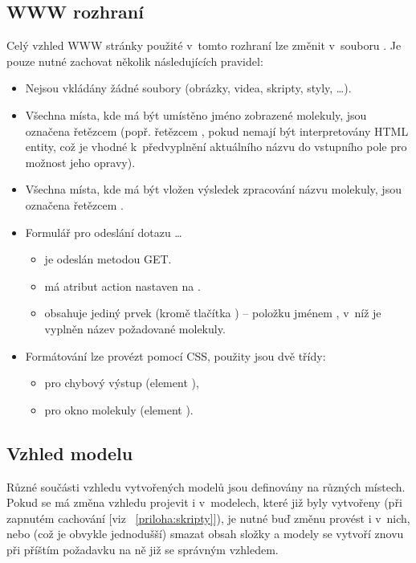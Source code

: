 \subsection{WWW rozhraní}
Celý vzhled WWW stránky použité v~tomto rozhraní lze změnit v~souboru
. Je pouze nutné zachovat několik následujících pravidel:
\begin{itemize}
	\item Nejsou vkládány žádné soubory (obrázky, videa, skripty, styly, \dots).
	\item Všechna místa, kde má být umístěno jméno zobrazené molekuly, jsou
		  označena řetězcem  (popř. řetězcem ,
		  pokud nemají být interpretovány HTML entity, což je vhodné k~předvyplnění
		  aktuálního názvu do vstupního pole pro možnost jeho opravy).
	\item Všechna místa, kde má být vložen výsledek zpracování názvu molekuly,
		  jsou označena řetězcem .
	\item Formulář pro odeslání dotazu \dots
		  \begin{itemize}
				\item je odeslán metodou GET.
				\item má atribut action nastaven na .
				\item obsahuje jediný prvek (kromě tlačítka ) --
					  položku jménem , v~níž je vyplněn název
					  požadované molekuly.
		  \end{itemize}
	\item Formátování lze provézt pomocí CSS, použity jsou dvě třídy:
		  \begin{itemize}
				\item {} pro chybový výstup (element ),
				\item {} pro okno molekuly (element ).
		  \end{itemize}
\end{itemize}

\subsection{Vzhled modelu}
Různé součásti vzhledu vytvořených modelů jsou definovány na různých místech.
Pokud se má změna vzhledu projevit i v~modelech, které již byly vytvořeny (při
zapnutém cachování [viz {\appendixname}~\ref{priloha:skripty}]), je nutné buď
změnu provést i v~nich, nebo (což je obvykle jednodušší) smazat obsah složky
 a modely se vytvoří znovu při příštím požadavku na ně již se
správným vzhledem.

